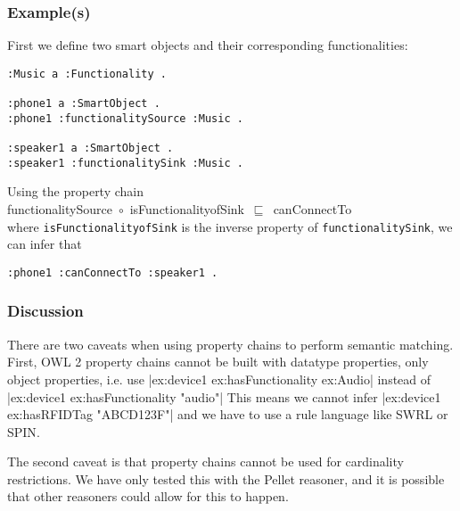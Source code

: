 \subsubsection{Example(s)}

First we define two smart objects and their corresponding functionalities:

\begin{verbatim}               
:Music a :Functionality .

:phone1 a :SmartObject .
:phone1 :functionalitySource :Music . 
              
:speaker1 a :SmartObject .
:speaker1 :functionalitySink :Music . 
\end{verbatim}

Using the property chain\\

\noindent
functionalitySource~\ensuremath{\circ}~isFunctionalityofSink~\ensuremath{\sqsubseteq}~canConnectTo\\

where \texttt{isFunctionalityofSink} is the inverse property of \texttt{functionalitySink}, we can infer that

\begin{verbatim}               
:phone1 :canConnectTo :speaker1 .
\end{verbatim}


\subsubsection{Discussion}

There are two caveats when using property chains to perform semantic matching. First, \ac{OWL} 2 property chains cannot be built with datatype properties, only object properties, i.e. use |ex:device1 ex:hasFunctionality ex:Audio| instead of |ex:device1 ex:hasFunctionality "audio"| This means we cannot infer |ex:device1 ex:hasRFIDTag "ABCD123F"| and we have to use a rule language like \ac{SWRL} or \ac{SPIN}.

The second caveat is that property chains cannot be used for cardinality restrictions. We have only tested this with the Pellet reasoner, and it is possible that other reasoners could allow for this to happen.

